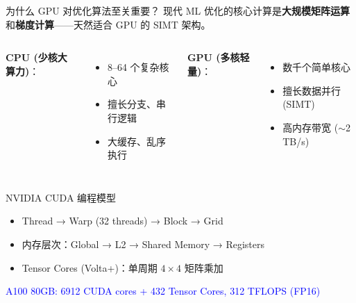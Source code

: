 \documentclass[11pt, aspectratio=169, svgnames, table, fontset=fandol]{ctexbeamer}
\begin{document}
\begin{frame}{为什么 GPU 对优化算法至关重要？}
  现代 ML 优化的核心计算是\textbf{大规模矩阵运算}和\textbf{梯度计算}——天然适合 GPU 的 SIMT 架构。

  \vspace{6pt}
  \begin{columns}[T]
    \textbf{CPU (少核大算力)}：
    \begin{itemize}
      \item 8--64 个复杂核心
      \item 擅长分支、串行逻辑
      \item 大缓存、乱序执行
    \end{itemize}
    \textbf{GPU (多核轻量)}：
    \begin{itemize}
      \item 数千个简单核心
      \item 擅长数据并行 (SIMT)
      \item 高内存带宽 ($\sim$2 TB/s)
    \end{itemize}
  \end{columns}

  \vspace{8pt}
  \begin{block}{NVIDIA CUDA 编程模型}
    \begin{itemize}
      \item Thread → Warp (32 threads) → Block → Grid
      \item 内存层次：Global → L2 → Shared Memory → Registers
      \item Tensor Cores (Volta+)：单周期 $4\times4$ 矩阵乘加
    \end{itemize}
  \end{block}

  \textcolor{blue}{A100 80GB: 6912 CUDA cores + 432 Tensor Cores, 312 TFLOPS (FP16)}
\end{frame}
\end{document}
